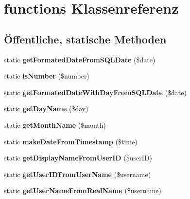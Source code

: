 \hypertarget{classfunctions}{}\section{functions Klassenreferenz}
\label{classfunctions}
\subsection*{Öffentliche, statische Methoden}
\begin{DoxyCompactItemize}
\item 
\mbox{\label{classfunctions_a450334948d02916c7476b974a7df6c8e}} 
static {\bfseries get\+Formated\+Date\+From\+S\+Q\+L\+Date} (\$date)
\item 
\mbox{\label{classfunctions_a809a4288e7ce0e051b5bddfe2d3cc21b}} 
static {\bfseries is\+Number} (\$number)
\item 
\mbox{\label{classfunctions_a54e9c4940c13b9e53f04072ba2b88694}} 
static {\bfseries get\+Formated\+Date\+With\+Day\+From\+S\+Q\+L\+Date} (\$date)
\item 
\mbox{\label{classfunctions_a443cf58845f1144422787acf89634235}} 
static {\bfseries get\+Day\+Name} (\$day)
\item 
\mbox{\label{classfunctions_a4b474d60c259bc1845eebce1aafd7d3c}} 
static {\bfseries get\+Month\+Name} (\$month)
\item 
\mbox{\label{classfunctions_a4d08bfc841ed9dfc9f46fef41c914e26}} 
static {\bfseries make\+Date\+From\+Timestamp} (\$time)
\item 
\mbox{\label{classfunctions_ab65690ec6fb44a1c914230c522e7ef8e}} 
static {\bfseries get\+Display\+Name\+From\+User\+ID} (\$user\+ID)
\item 
\mbox{\label{classfunctions_af3755b990478220acd05ed8f26c2e84c}} 
static {\bfseries get\+User\+I\+D\+From\+User\+Name} (\$username)
\item 
\mbox{\label{classfunctions_a97583d0f4c2f4261db385e05b7671a80}} 
static {\bfseries get\+User\+Name\+From\+Real\+Name} (\$username)

\end{DoxyCompactItemize}
